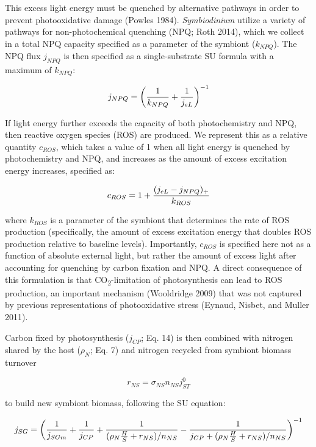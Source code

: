 \documentclass[]{elsarticle} %
\begin{document}
This excess light energy must be quenched by alternative pathways in
order to prevent photooxidative damage (Powles 1984).
\emph{Symbiodinium} utilize a variety of pathways for non-photochemical
quenching (NPQ; Roth 2014), which we collect in a total NPQ capacity
specified as a parameter of the symbiont (\(k_{NPQ}\)). The NPQ flux
\(j_{NPQ}\) is then specified as a single-substrate SU formula with a
maximum of \(k_{NPQ}\):

\begin{equation} j_{NPQ} = \bigg({1 \over k_{NPQ}} + {1 \over j_{eL}}\bigg)^{-1} \end{equation}

If light energy further exceeds the capacity of both photochemistry and
NPQ, then reactive oxygen species (ROS) are produced. We represent this
as a relative quantity \(c_{ROS}\), which takes a value of 1 when all
light energy is quenched by photochemistry and NPQ, and increases as the
amount of excess excitation energy increases, specified as:

\begin{equation} c_{ROS} = 1 + {{(j_{eL} - j_{NPQ})_+} \over k_{ROS}} \end{equation}

where \(k_{ROS}\) is a parameter of the symbiont that determines the
rate of ROS production (specifically, the amount of excess excitation
energy that doubles ROS production relative to baseline levels).
Importantly, \(c_{ROS}\) is specified here not as a function of absolute
external light, but rather the amount of excess light after accounting
for quenching by carbon fixation and NPQ. A direct consequence of this
formulation is that CO\textsubscript{2}-limitation of photosynthesis can
lead to ROS production, an important mechanism (Wooldridge 2009) that
was not captured by previous representations of photooxidative stress
(Eynaud, Nisbet, and Muller 2011).

Carbon fixed by photosynthesis (\(j_{CP}\); Eq. 14) is then combined
with nitrogen shared by the host (\(\rho_N\); Eq. 7) and nitrogen
recycled from symbiont biomass turnover

\begin{equation} r_{NS}=\sigma_{NS}n_{NS}j_{ST}^0 \end{equation}

to build new symbiont biomass, following the SU equation:

\begin{equation} j_{SG} = \bigg({1 \over j_{SGm}} + {1 \over j_{CP}} + {1 \over {(\rho_N{H \over S} + r_{NS}) / n_{NS}}} - {1 \over {j_{CP} + (\rho_N{H \over S} + r_{NS}) / n_{NS}}}\bigg)^{-1} \end{equation}
\end{document}
